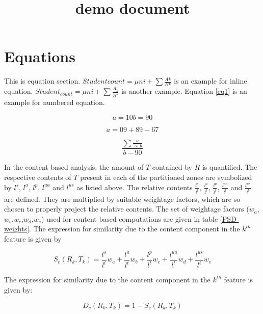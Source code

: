 \documentclass[journal] {article}
\begin{document}
\title{demo document}
\maketitle


\section{Equations}

This is equation section. $ Studentcount = \mu{ni} + \sum\frac{Ak}{Bk}$ is an example for inline equation. $ Student_{count} = \mu{ni} + \sum\frac{A_k}{B^k}$ is another example. Equation-\ref{eq1} is an example for numbered equation.

\begin{equation}
	a=10
	b=90
\end{equation}


	\[
	a=09+89-67
\]


\begin{equation}
\frac{\sum\frac{a}{\varpi b}}{b-90}
\label{eq1}
\end{equation}




In the content based analysis, the amount of  $T$ contained by $R$ is quantified. The respective contents of $T$ present in each of the partitioned zones are symbolized by $l^s$, $l^a$, $l^p$, $l^{ua}$ and $l^{us}$ as listed above.  The relative contents $\frac{l^s}{l^t}$, $\frac{l^a}{l^t}$, $\frac{l^p}{l^t}$, $\frac{l^{ua}}{l^t}$ and $\frac{l^{us}}{l^t}$ are defined. They are multiplied by suitable weightage factors, which are so chosen to properly project the relative contents. The set of weightage factors ($w_a$,$w_b$,$w_c$,$w_d$,$w_e$) used for content based computations are given in table-\ref{PSD-weights}. The expression for similarity due to the content component in the $k^{th}$ feature is given by


\begin{equation}\label{SC}
		S_c(R_k, T_k) = \frac{l^s}{l^t}w_a + \frac{l^a}{l^t}w_b + \frac{l^p}{l^t}w_c + \frac{l^{ua}}{l^t}w_d + \frac{l^{us}}{l^t}w_e 
	\end{equation} 
	
	The expression for similarity due to the content component in the $k^{th}$ feature is given by:



\begin{equation}\label{DC}
		D_c(R_k, T_k) = 1 - S_c(R_k, T_k) 
	\end{equation}
\end{document}
